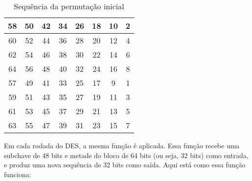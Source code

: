 \begin{table}[h!]
\centering
\begin{tabular}{|*{8}{c|}}
\hline
58 & 50 & 42 & 34 & 26 & 18 & 10 & 2 \\
\hline
60 & 52 & 44 & 36 & 28 & 20 & 12 & 4 \\
\hline
62 & 54 & 46 & 38 & 30 & 22 & 14 & 6 \\
\hline
64 & 56 & 48 & 40 & 32 & 24 & 16 & 8 \\
\hline
57 & 49 & 41 & 33 & 25 & 17 & 9  & 1 \\
\hline
59 & 51 & 43 & 35 & 27 & 19 & 11 & 3 \\
\hline
61 & 53 & 45 & 37 & 29 & 21 & 13 & 5 \\
\hline
63 & 55 & 47 & 39 & 31 & 23 & 15 & 7 \\
\hline
\end{tabular}
\caption{Sequência da permutação inicial}
\end{table}

Em cada rodada do DES, a mesma função é aplicada.
Essa função recebe uma subchave de 48 bits e metade do bloco de 64 bits (ou seja, 32 bits) como entrada, e produz uma nova sequência de 32 bits como saída.
Aqui está como essa função funciona:

